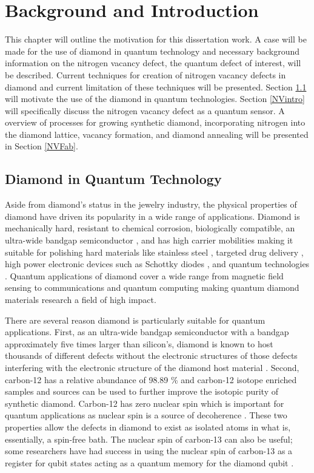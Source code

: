 \chapter{Background and Introduction}
\label{chIntro}

This chapter will outline the motivation for this dissertation work. A case will be made for the use of diamond in quantum technology and necessary background information on the nitrogen vacancy defect, the quantum defect of interest, will be described. Current techniques for creation of nitrogen vacancy defects in diamond and current limitation of these techniques will be presented. Section \ref{quantumtech} will motivate the use of the diamond in quantum technologies. Section \ref{NVintro} will specifically discuss the nitrogen vacancy defect as a quantum sensor. A overview of processes for growing synthetic diamond, incorporating nitrogen into the diamond lattice, vacancy formation, and diamond annealing will be presented in Section \ref{NVFab}.

\section{Diamond in Quantum Technology}
\label{quantumtech}
\indent
	
	Aside from diamond's status in the jewelry industry, the physical properties of diamond have driven its popularity in a wide range of applications. Diamond is mechanically hard, resistant to chemical corrosion, biologically compatible, an ultra-wide bandgap semiconductor \cite{PaulM2000}, and has high carrier mobilities \cite{Isberg2002} making it suitable for polishing hard materials like stainless steel \cite{Ranjan2019}, targeted drug delivery \cite{Man2012}, high power electronic devices such as Schottky diodes \cite{Nicley2015}, and quantum technologies \cite{Greentree2008}. Quantum applications of diamond cover a wide range from magnetic field sensing \cite{Maze2008} to communications \cite{Lin2019} and quantum computing \cite{Weber2010} making quantum diamond materials research a field of high impact.

	There are several reason diamond is particularly suitable for quantum applications. First, as an ultra-wide bandgap semiconductor with a bandgap approximately five times larger than silicon's, diamond is known to host thousands of different defects without the electronic structures of those defects interfering with the electronic structure of the diamond host material \cite{Weber2010}. Second, carbon-12 has a relative abundance of 98.89 \% and carbon-12 isotope enriched samples and sources can be used to further improve the isotopic purity of synthetic diamond. Carbon-12 has zero nuclear spin which is important for quantum applications as nuclear spin is a source of decoherence \cite{Man2012}. These two properties allow the defects in diamond to exist as isolated atoms in what is, essentially, a spin-free bath. The nuclear spin of carbon-13 can also be useful; some researchers have had success in using the nuclear spin of carbon-13 as a register for qubit states acting as a quantum memory for the diamond qubit \cite{Bradley2019AMinute}.

